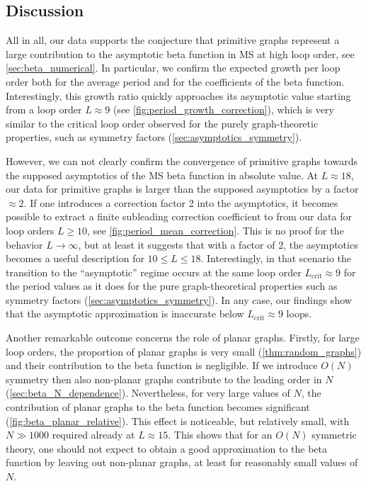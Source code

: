 \documentclass[12pt,a4paper]{article}
\renewcommand{\|}{\rule[-0.4ex]{0.2ex}{1.2em}}
\begin{document}
\subsection{Discussion}\label{sec:discussion}





All in all, our data supports the conjecture that primitive graphs represent a large contribution to the asymptotic beta function in MS at high loop order, see \cref{sec:beta_numerical}. In particular, we confirm the expected growth per loop order both for the average period and for the coefficients of the beta function.   
Interestingly, this growth ratio quickly approaches its asymptotic value starting from a loop order $L \approx 9$ (see \cref{fig:period_growth_correction}), which is very similar to the critical loop order observed for the   purely graph-theoretic properties, such as symmetry factors (\cref{sec:asymptotics_symmetry}). 

However, we can not clearly confirm the convergence of primitive graphs towards the supposed asymptotics of the MS beta function in absolute value. At $L \approx 18$, our data for primitive graphs is larger than the supposed asymptotics by a factor $\approx 2$. If one introduces a correction factor 2 into the asymptotics, it becomes possible to extract a finite subleading correction coefficient to from our data  for loop orders $L \geq 10$, see \cref{fig:period_mean_correction}. This is no proof for the behavior $L \rightarrow \infty$, but at least it suggests that with a factor of 2, the asymptotics becomes a useful description for $10 \leq L \leq 18$. Interestingly, in that scenario the transition to the \enquote{asymptotic} regime occurs at the same loop order $L_\text{crit}\approx 9$ for the period values as it does for the pure graph-theoretical properties such as symmetry factors (\cref{sec:asymptotics_symmetry}). In any case, our findings show that the asymptotic approximation is inaccurate below $L_\text{crit}\approx 9$ loops.


Another remarkable outcome concerns the  role of planar graphs. Firstly, for large loop orders, the proportion of planar graphs is very small (\cref{thm:random_graphs}) and their contribution to the beta function is negligible. If we introduce $O(N)$ symmetry then also non-planar graphs contribute to the leading order in $N$ (\cref{sec:beta_N_dependence}).  Nevertheless, for very large values of $N$, the contribution of planar graphs to the beta function becomes significant (\cref{fig:beta_planar_relative}). This effect is noticeable, but relatively small,  with $N \gg 1000$ required already at $L \approx 15$. This shows that for an $O(N)$ symmetric theory, one should not expect to obtain a good approximation to the beta function by leaving out non-planar graphs, at least for reasonably small values of $N$. 
\end{document}

